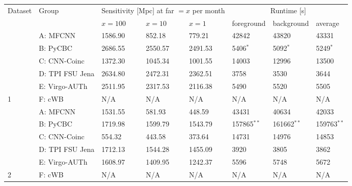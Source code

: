 \begin{tabularx}{0.98\textwidth}{|X|X|X|X|X|X|X|X|}
    \hline
    \multirow{2}{*}{Dataset} & \multirow{2}{*}{Group} & \multicolumn{3}{c|}{Sensitivity [Mpc] at \acrshort{far} $=x$ per month} & \multicolumn{3}{c|}{Runtime [s]} \\
    \cline{3-8}
     & & $x=100$ & $x=10$ & $x=1$ & foreground & background & average \\
    \hline
    \cellcolor{Gray} &  A: MFCNN &  1586.90 &  852.18 &  779.21 &  42842 &  43820 &  43331 \\
    \cellcolor{Gray} & \cellcolor{Gray}B: PyCBC & \cellcolor{Gray}2686.55 & \cellcolor{Gray}2550.57 & \cellcolor{Gray}2491.53 & \cellcolor{Gray}5406$^\ast$ & \cellcolor{Gray}5092$^\ast$ & \cellcolor{Gray}5249$^\ast$ \\
    \cellcolor{Gray} &  C: CNN-Coinc &  1372.30 &  1045.34 &  1001.55 &  14003 &  12996 &  13500 \\
    \cellcolor{Gray} & \cellcolor{Gray}D: TPI FSU Jena & \cellcolor{Gray}2634.80 & \cellcolor{Gray}2472.31 & \cellcolor{Gray}2362.51 & \cellcolor{Gray}3758 & \cellcolor{Gray}3530 & \cellcolor{Gray}3644 \\
    \cellcolor{Gray} &  E: Virgo-AUTh &  2511.95 &  2317.53 &  2116.38 &  5490 &  5520 &  5505 \\
    \multirow{-6}{*}{\cellcolor{Gray}1} & \cellcolor{Gray}F: cWB & \cellcolor{Gray}N/A & \cellcolor{Gray}N/A & \cellcolor{Gray}N/A & \cellcolor{Gray}N/A & \cellcolor{Gray}N/A & \cellcolor{Gray}N/A \\
    \hline
      &  A: MFCNN &  1531.55 &  581.93 &  448.59 &  43431 &  40634 &  42033 \\
      & \cellcolor{Gray}B: PyCBC & \cellcolor{Gray}1719.98 & \cellcolor{Gray}1599.79 & \cellcolor{Gray}1543.79 & \cellcolor{Gray}157865$^{\ast\ast}$ & \cellcolor{Gray}161662$^{\ast\ast}$ & \cellcolor{Gray}159763$^{\ast\ast}$ \\
      &  C: CNN-Coinc &  554.32 &  443.58 &  373.64 &  14731 &  14976 &  14853 \\
      & \cellcolor{Gray}D: TPI FSU Jena & \cellcolor{Gray}1712.13 & \cellcolor{Gray}1544.28 & \cellcolor{Gray}1455.09 & \cellcolor{Gray}3920 & \cellcolor{Gray}3805 & \cellcolor{Gray}3862 \\
      &  E: Virgo-AUTh &  1608.97 &  1409.95 &  1242.37 &  5596 &  5748 &  5672 \\
    \multirow{-6}{*}{ 2} & \cellcolor{Gray}F: cWB & \cellcolor{Gray}N/A & \cellcolor{Gray}N/A & \cellcolor{Gray}N/A & \cellcolor{Gray}N/A & \cellcolor{Gray}N/A & \cellcolor{Gray}N/A \\

\end{tabularx}
